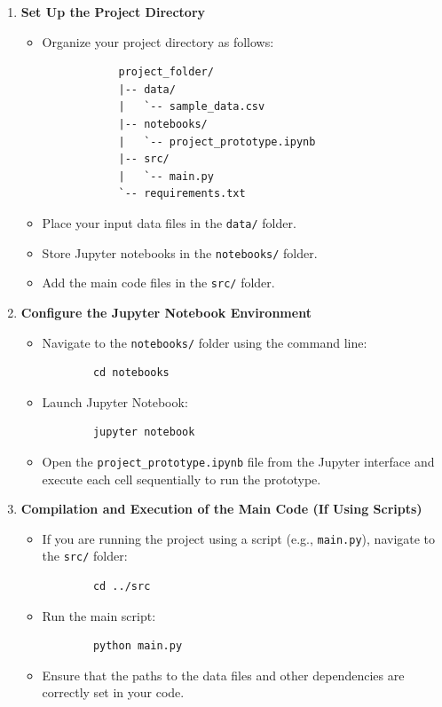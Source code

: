 \begin{enumerate}
    \item \textbf{Set Up the Project Directory}
    \begin{itemize}
        \item Organize your project directory as follows:
        \begin{verbatim}
            project_folder/
            |-- data/
            |   `-- sample_data.csv
            |-- notebooks/
            |   `-- project_prototype.ipynb
            |-- src/
            |   `-- main.py
            `-- requirements.txt
        \end{verbatim}
            
        \item Place your input data files in the \texttt{data/} folder.
        \item Store Jupyter notebooks in the \texttt{notebooks/} folder.
        \item Add the main code files in the \texttt{src/} folder.
    \end{itemize}

    \item \textbf{Configure the Jupyter Notebook Environment}
    \begin{itemize}
        \item Navigate to the \texttt{notebooks/} folder using the command line:
        \begin{verbatim}
        cd notebooks
        \end{verbatim}
        \item Launch Jupyter Notebook:
        \begin{verbatim}
        jupyter notebook
        \end{verbatim}
        \item Open the \texttt{project\_prototype.ipynb} file from the Jupyter interface and execute each cell sequentially to run the prototype.
    \end{itemize}

    \item \textbf{Compilation and Execution of the Main Code (If Using Scripts)}
    \begin{itemize}
        \item If you are running the project using a script (e.g., \texttt{main.py}), navigate to the \texttt{src/} folder:
        \begin{verbatim}
        cd ../src
        \end{verbatim}
        \item Run the main script:
        \begin{verbatim}
        python main.py
        \end{verbatim}
        \item Ensure that the paths to the data files and other dependencies are correctly set in your code.
    \end{itemize}


\end{enumerate}
